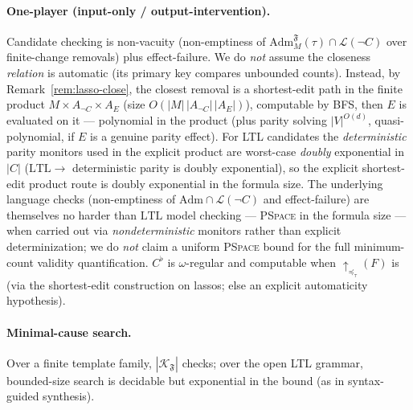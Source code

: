 \documentclass[11pt]{article}
\theoremstyle{remark}
\newcommand{\LTL}{\mathrm{LTL}}
\newcommand{\Lang}{\mathcal{L}}
\newcommand{\Frame}{\mathfrak{F}}
\newcommand{\Adm}{\mathrm{Adm}}
\begin{document}
\paragraph{One-player (input-only / output-intervention).} Candidate checking is
non-vacuity (non-emptiness of \(\Adm_M^{\Frame}(\tau)\cap\Lang(\neg C)\) over
finite-change removals) plus effect-failure. We do \emph{not} assume the closeness
\emph{relation} is automatic (its primary key compares unbounded counts). Instead,
by Remark~\ref{rem:lasso-close}, the closest removal is a shortest-edit path in the
finite product \(M\times A_{\neg C}\times A_E\) (size \(O(|M|\,|A_{\neg C}|\,
|A_E|)\)), computable by BFS, then \(E\) is evaluated on it --- polynomial in the
product (plus parity solving \(|V|^{O(d)}\), quasi-polynomial, if \(E\) is a
genuine parity effect). For LTL candidates the \emph{deterministic} parity
monitors used in the explicit product are worst-case \emph{doubly} exponential in
\(|C|\) (\(\LTL\to\) deterministic parity is doubly exponential), so the explicit
shortest-edit product route is doubly exponential in the formula size. The
underlying language checks (non-emptiness of \(\Adm\cap\Lang(\neg C)\) and
effect-failure) are themselves no harder than \(\LTL\) model checking ---
\textsc{PSpace} in the formula size --- when carried out via \emph{nondeterministic}
monitors rather than explicit determinization; we do \emph{not} claim a uniform
\textsc{PSpace} bound for the full minimum-count validity quantification.
\(C^{\flat}\) is \(\omega\)-regular and computable when
\(\uparrow_{\preceq_\tau}(F)\) is (via the shortest-edit construction on lassos;
else an explicit automaticity hypothesis).

\paragraph{Minimal-cause search.} Over a finite template family,
\(|\mathcal{K}_{\Frame}|\) checks; over the open LTL grammar, bounded-size search
is decidable but exponential in the bound (as in syntax-guided synthesis).
\end{document}
